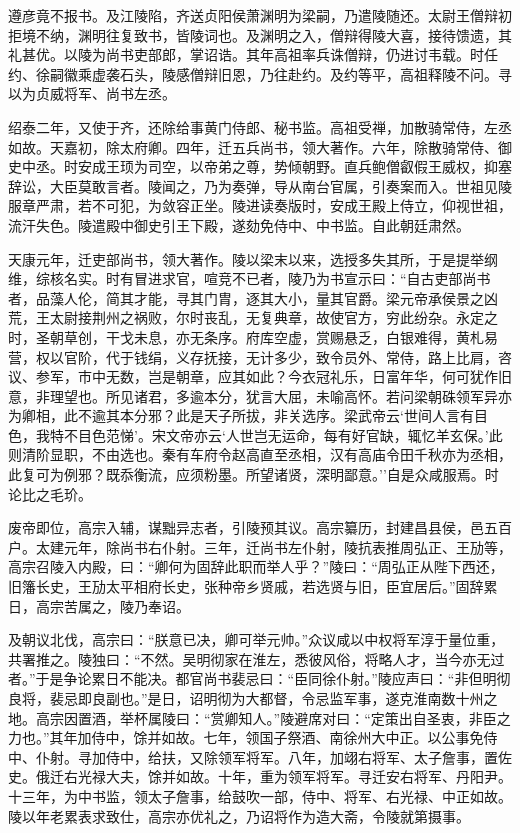 \documentclass[]{article}
\begin{document}
遵彦竟不报书。及江陵陷，齐送贞阳侯萧渊明为梁嗣，乃遣陵随还。太尉王僧辩初拒境不纳，渊明往复致书，皆陵词也。及渊明之入，僧辩得陵大喜，接待馈遗，其礼甚优。以陵为尚书吏部郎，掌诏诰。其年高祖率兵诛僧辩，仍进讨韦载。时任约、徐嗣徽乘虚袭石头，陵感僧辩旧恩，乃往赴约。及约等平，高祖释陵不问。寻以为贞威将军、尚书左丞。

绍泰二年，又使于齐，还除给事黄门侍郎、秘书监。高祖受禅，加散骑常侍，左丞如故。天嘉初，除太府卿。四年，迁五兵尚书，领大著作。六年，除散骑常侍、御史中丞。时安成王顼为司空，以帝弟之尊，势倾朝野。直兵鲍僧叡假王威权，抑塞辞讼，大臣莫敢言者。陵闻之，乃为奏弹，导从南台官属，引奏案而入。世祖见陵服章严肃，若不可犯，为敛容正坐。陵进读奏版时，安成王殿上侍立，仰视世祖，流汗失色。陵遣殿中御史引王下殿，遂劾免侍中、中书监。自此朝廷肃然。

天康元年，迁吏部尚书，领大著作。陵以梁末以来，选授多失其所，于是提举纲维，综核名实。时有冒进求官，喧竞不已者，陵乃为书宣示曰：``自古吏部尚书者，品藻人伦，简其才能，寻其门胄，逐其大小，量其官爵。梁元帝承侯景之凶荒，王太尉接荆州之祸败，尔时丧乱，无复典章，故使官方，穷此纷杂。永定之时，圣朝草创，干戈未息，亦无条序。府库空虚，赏赐悬乏，白银难得，黄札易营，权以官阶，代于钱绢，义存抚接，无计多少，致令员外、常侍，路上比肩，咨议、参军，市中无数，岂是朝章，应其如此？今衣冠礼乐，日富年华，何可犹作旧意，非理望也。所见诸君，多逾本分，犹言大屈，未喻高怀。若问梁朝硃领军异亦为卿相，此不逾其本分邪？此是天子所拔，非关选序。梁武帝云`世间人言有目色，我特不目色范悌'。宋文帝亦云`人世岂无运命，每有好官缺，辄忆羊玄保。'此则清阶显职，不由选也。秦有车府令赵高直至丞相，汉有高庙令田千秋亦为丞相，此复可为例邪？既忝衡流，应须粉墨。所望诸贤，深明鄙意。''自是众咸服焉。时论比之毛玠。

废帝即位，高宗入辅，谋黜异志者，引陵预其议。高宗纂历，封建昌县侯，邑五百户。太建元年，除尚书右仆射。三年，迁尚书左仆射，陵抗表推周弘正、王劢等，高宗召陵入内殿，曰：``卿何为固辞此职而举人乎？''陵曰：``周弘正从陛下西还，旧籓长史，王劢太平相府长史，张种帝乡贤戚，若选贤与旧，臣宜居后。''固辞累日，高宗苦属之，陵乃奉诏。

及朝议北伐，高宗曰：``朕意已决，卿可举元帅。''众议咸以中权将军淳于量位重，共署推之。陵独曰：``不然。吴明彻家在淮左，悉彼风俗，将略人才，当今亦无过者。''于是争论累日不能决。都官尚书裴忌曰：``臣同徐仆射。''陵应声曰：``非但明彻良将，裴忌即良副也。''是日，诏明彻为大都督，令忌监军事，遂克淮南数十州之地。高宗因置酒，举杯属陵曰：``赏卿知人。''陵避席对曰：``定策出自圣衷，非臣之力也。''其年加侍中，馀并如故。七年，领国子祭酒、南徐州大中正。以公事免侍中、仆射。寻加侍中，给扶，又除领军将军。八年，加翊右将军、太子詹事，置佐史。俄迁右光禄大夫，馀并如故。十年，重为领军将军。寻迁安右将军、丹阳尹。十三年，为中书监，领太子詹事，给鼓吹一部，侍中、将军、右光禄、中正如故。陵以年老累表求致仕，高宗亦优礼之，乃诏将作为造大斋，令陵就第摄事。
\end{document}
